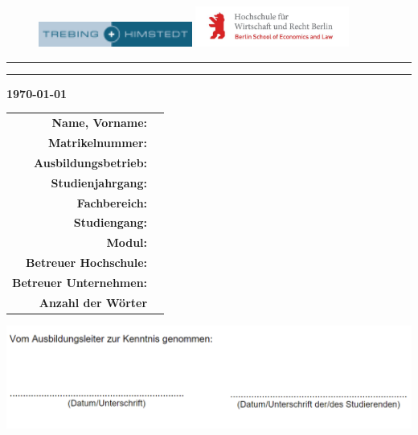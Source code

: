 \begin{titlepage}
	\begin{figure}[ht!]
		\includegraphics[width=0.45\textwidth]{img/th_header_logo.png} \hfill
		\includegraphics[width=0.45\textwidth]{img/hwr_header_logo.png}
	\end{figure}
	\vspace{20pt}
	\centering \textbf{\huge \zTyp}
	\normalfont\endgraf\rule{\textwidth}{.4pt}\endgraf{}
	\begingroup
		\centering
		\linespread{2.5}
		\huge\zTitel{}
	\endgroup
	\linespread{1.5}
	\endgraf\rule{\textwidth}{.4pt}
	\hfill
	\begin{center}
		\textbf{\today}
		\endgraf{}
	\end{center}
	\begin{tabular}{rl}
		\textbf{\normalsize{Name, Vorname:}}        & \normalsize{\zStudent} \\
		\textbf{\normalsize{Matrikelnummer:}}       & \normalsize{\zMatrikelnr} \\
		\textbf{\normalsize{Ausbildungsbetrieb:}}   & \normalsize{\zBetrieb} \\
		\textbf{\normalsize{Studienjahrgang:}}      & \normalsize{\zJahrgang} \\
		\textbf{\normalsize{Fachbereich:}}          & \normalsize{\zFachbereich} \\
		\textbf{\normalsize{Studiengang:}}          & \normalsize{\zStudiengang} \\
		\textbf{\normalsize{Modul:}}                & \normalsize{\zModul} \\
		\textbf{\normalsize{Betreuer Hochschule:}}  & \normalsize{\zBetreuerHs} \\
		\textbf{\normalsize{Betreuer Unternehmen:}} & \normalsize{\zBetreuerUn} \\
		\textbf{\normalsize{Anzahl der Wörter}}     & \normalsize{\zAnzahlWoerter} \\
	\end{tabular}
	\endgraf{}
	\vspace{50pt}
	\includegraphics[scale=0.5]{img/ptb-signature.png}
\end{titlepage}